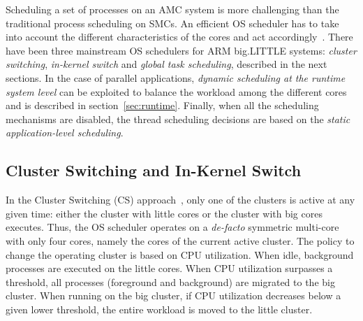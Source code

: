 Scheduling a set of processes on an AMC system is more challenging than the traditional process scheduling on SMCs. 
An efficient OS scheduler has to take into account the different characteristics of the cores and act accordingly~\cite{coolingAware}.
There have been three mainstream OS schedulers for ARM big.LITTLE systems: \textit{cluster switching}, 
\textit{in-kernel switch} and \textit{global task scheduling}, described in the next sections.
In the case of parallel applications, \textit{dynamic scheduling at the runtime system level} can be exploited to balance the workload among the different cores and is described in section~\ref{sec:runtime}.
Finally, when all the scheduling mechanisms are disabled, the thread scheduling decisions are based on the \textit{static application-level scheduling}.


\subsection{Cluster Switching and In-Kernel Switch}
In the Cluster Switching (CS) approach~\cite{samsung}, only one of the clusters is active at any given time: either the cluster with little cores or the cluster with big cores executes. Thus, the OS scheduler operates on a \emph{de-facto} symmetric multi-core with only four cores, namely the cores of the current active cluster. The policy to change the operating cluster is based on CPU utilization. When idle, background processes are executed on the little cores. When CPU utilization surpasses a threshold, all processes (foreground and background) are migrated to the big cluster. When running on the big cluster, if CPU utilization decreases below a given lower threshold, the entire workload is moved to the little cluster. 

